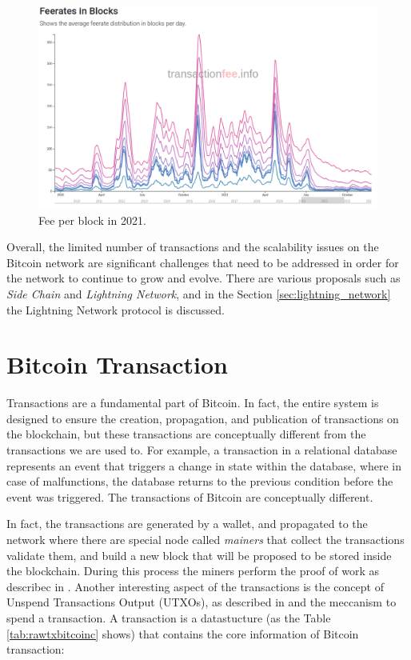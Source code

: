 \begin{figure}
    \begin{center}
      \includegraphics[scale=0.3]{imgs/feerate_blocks.png}
    \end{center}
    \caption{Fee per block in 2021.}
    \label{fig:fee_x_block}
\end{figure}


Overall, the limited number of transactions and the scalability issues on the Bitcoin network
are significant challenges that need to be addressed in order for the network to continue
to grow and evolve. There are various proposals such as \emph{Side Chain} and \emph{Lightning Network}, 
and in the Section \ref{sec:lightning_network} the Lightning Network protocol is discussed.


\section{Bitcoin Transaction}

Transactions are a fundamental part of Bitcoin. In fact, the entire system is designed to ensure
the creation, propagation, and publication of transactions on the blockchain, but these
transactions are conceptually different from the transactions we are used to.
For example, a transaction in a relational database represents an event that triggers a
change in state within the database, where in case of malfunctions, the database returns
to the previous condition before the event was triggered.
The transactions of Bitcoin are conceptually different.

In fact, the transactions are generated by a wallet, and propagated to the network
where there are special node called \emph{mainers} that collect the transactions
validate them, and build a new block that will be proposed to be stored inside 
the blockchain. During this process the miners perform the proof of work as 
describec in \cite{Palazzo_Estrazione_di_Informazioni_2021}.
Another interesting aspect of the transactions is the concept of 
Unspend Transactions Output (UTXOs), as described in \cite{Palazzo_Estrazione_di_Informazioni_2021} 
and the meccanism to spend a transaction.
A transaction is a datastucture (as the Table \ref{tab:rawtxbitcoinc} shows) that contains the core information
of Bitcoin transaction: 

